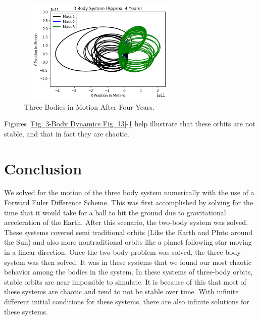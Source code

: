 \documentclass[twocolumn]{article}
\begin{document}
\begin{figure}[h]
    \centering
    \includegraphics[width=8cm, height=5cm]{Figures/3-Body Dynamics (15).png}
    \caption{\small{Three Bodies in Motion After Four Years.}}
    \label{Fig. 3-Body Dynamics Fig. 15}
\end{figure}
\par \noindent
Figures \ref{Fig. 3-Body Dynamics Fig. 13}-\ref{Fig. 3-Body Dynamics Fig. 15} help illustrate that these orbits are not stable, and that in fact they are chaotic.
\section{Conclusion}
We solved for the motion of the three body system numerically with the use of a Forward Euler Difference Scheme. This was first accomplished by solving for the time that it would take for a ball to hit the ground due to gravitational acceleration of the Earth. After this scenario, the two-body system was solved. These systems covered semi traditional orbits (Like the Earth and Pluto around the Sun) and also more nontraditional orbits like a planet following star moving in a linear direction. Once the two-body problem was solved, the three-body system was then solved. It was in these systems that we found our most chaotic behavior among the bodies in the system. In these systems of three-body orbits, stable orbits are near impossible to simulate. It is because of this that most of these systems are chaotic and tend to not be stable over time. With infinite different initial conditions for these systems, there are also infinite solutions for these systems.
\clearpage
{}
\end{document}
